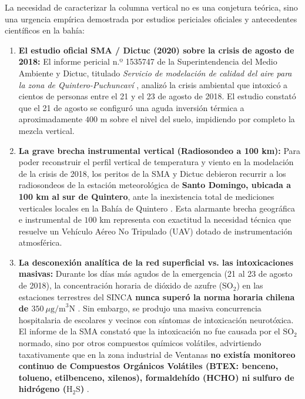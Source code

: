 \documentclass[letterpaper,12pt]{article}
\begin{document}
La necesidad de caracterizar la columna vertical no es una conjetura teórica, sino una urgencia empírica demostrada por estudios periciales oficiales y antecedentes científicos en la bahía:

\begin{enumerate}
    \item \textbf{El estudio oficial SMA / Dictuc (2020) sobre la crisis de agosto de 2018:}
    El informe pericial n.º 1535747 de la Superintendencia del Medio Ambiente y Dictuc, titulado \textit{Servicio de modelación de calidad del aire para la zona de Quintero-Puchuncaví} \cite{sma_dictuc}, analizó la crisis ambiental que intoxicó a cientos de personas entre el 21 y el 23 de agosto de 2018. El estudio constató que el 21 de agosto se configuró una aguda inversión térmica a aproximadamente $400\text{ m}$ sobre el nivel del suelo, impidiendo por completo la mezcla vertical.
    
    \item \textbf{La grave brecha instrumental vertical (Radiosondeo a 100 km):}
    Para poder reconstruir el perfil vertical de temperatura y viento en la modelación de la crisis de 2018, los peritos de la SMA y Dictuc debieron recurrir a los radiosondeos de la estación meteorológica de \textbf{Santo Domingo, ubicada a 100 km al sur de Quintero}, ante la inexistencia total de mediciones verticales locales en la Bahía de Quintero \cite{sma_dictuc}. Esta alarmante brecha geográfica e instrumental de $100\text{ km}$ representa con exactitud la necesidad técnica que resuelve un Vehículo Aéreo No Tripulado (UAV) dotado de instrumentación atmosférica.

    \item \textbf{La desconexión analítica de la red superficial vs. las intoxicaciones masivas:}
    Durante los días más agudos de la emergencia (21 al 23 de agosto de 2018), la concentración horaria de dióxido de azufre ($\text{SO}_2$) en las estaciones terrestres del SINCA \textbf{nunca superó la norma horaria chilena de $350\ \mu\text{g/m}^3\text{N}$} \cite{sma_dictuc}. Sin embargo, se produjo una masiva concurrencia hospitalaria de escolares y vecinos con síntomas de intoxicación neurotóxica. El informe de la SMA constató que la intoxicación no fue causada por el $\text{SO}_2$ normado, sino por otros compuestos químicos volátiles, advirtiendo taxativamente que en la zona industrial de Ventanas \textbf{no existía monitoreo continuo de Compuestos Orgánicos Volátiles (BTEX: benceno, tolueno, etilbenceno, xilenos), formaldehído (HCHO) ni sulfuro de hidrógeno ($\text{H}_2\text{S}$)} \cite{sma_dictuc}.


\end{enumerate}
\end{document}
